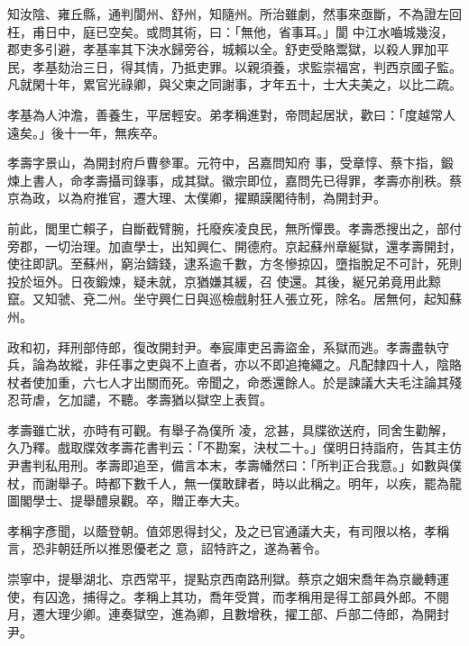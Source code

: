 \begin{pinyinscope}
 知汝陰、雍丘縣，通判閬州、舒州，知隨州。所治雖劇，然事來亟斷，不為證左回枉，甫日中，庭已空矣。或問其術，曰：「無他，省事耳。」閬
 中江水嚙城幾沒，郡吏多引避，孝基率其下決水歸旁谷，城賴以全。舒吏受賂鬻獄，以殺人罪加平民，孝基劾治三日，得其情，乃抵吏罪。以親須養，求監崇福宮，判西京國子監。凡就閑十年，累官光祿卿，與父柬之同謝事，才年五十，士大夫美之，以比二疏。



 孝基為人沖澹，善養生，平居輕安。弟孝稱進對，帝問起居狀，歡曰：「度越常人遠矣。」後十一年，無疾卒。



 孝壽字景山，為開封府戶曹參軍。元符中，呂嘉問知府
 事，受章惇、蔡卞指，鍛煉上書人，命孝壽攝司錄事，成其獄。徽宗即位，嘉問先已得罪，孝壽亦削秩。蔡京為政，以為府推官，遷大理、太僕卿，擢顯謨閣待制，為開封尹。



 前此，閭里亡賴子，自斷截臂腕，托廢疾凌良民，無所憚畏。孝壽悉搜出之，部付旁郡，一切治理。加直學士，出知興仁、開德府。京起蘇州章綖獄，還孝壽開封，使往即訊。至蘇州，窮治鑄錢，逮系逾千數，方冬慘掠囚，墮指脫足不可計，死則投於垣外。日夜鍛煉，疑未就，京猶嫌其緩，召
 使還。其後，綖兄弟竟用此黥竄。又知虢、兗二州。坐守興仁日與巡檢戲射狂人張立死，除名。居無何，起知蘇州。



 政和初，拜刑部侍郎，復改開封尹。奉宸庫吏呂壽盜金，系獄而逃。孝壽盡執守兵，論為故縱，非任事之吏與不上直者，亦以不即追掩繩之。凡配隸四十人，陰賂杖者使加重，六七人才出關而死。帝聞之，命悉還餘人。於是諫議大夫毛注論其殘忍苛虐，乞加譴，不聽。孝壽猶以獄空上表賀。



 孝壽雖亡狀，亦時有可觀。有舉子為僕所
 凌，忿甚，具牒欲送府，同舍生勸解，久乃釋。戲取牒效孝壽花書判云：「不勘案，決杖二十。」僕明日持詣府，告其主仿尹書判私用刑。孝壽即追至，備言本末，孝壽幡然曰：「所判正合我意。」如數與僕杖，而謝舉子。時都下數千人，無一僕敢肆者，時以此稱之。明年，以疾，罷為龍圖閣學士、提舉醴泉觀。卒，贈正奉大夫。



 孝稱字彥聞，以蔭登朝。值郊恩得封父，及之已官通議大夫，有司限以格，孝稱言，恐非朝廷所以推恩優老之
 意，詔特許之，遂為著令。



 崇寧中，提舉湖北、京西常平，提點京西南路刑獄。蔡京之姻宋喬年為京畿轉運使，有囚逸，捕得之。孝稱上其功，喬年受賞，而孝稱用是得工部員外郎。不閱月，遷大理少卿。連奏獄空，進為卿，且數增秩，擢工部、戶部二侍郎，為開封尹。




\end{pinyinscope}
